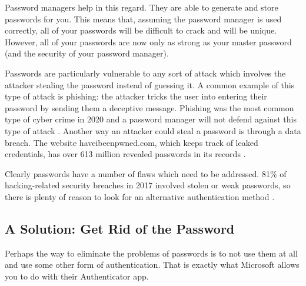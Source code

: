 \documentclass[12pt, letterpaper]{article}
\begin{document}
Password managers help in this regard.
They are able to generate and store passwords for you.
This means that, assuming the password manager is used correctly, all of your passwords will be difficult to crack and will be unique. 
However, all of your passwords are now only as strong as your master password (and the security of your password manager).

Passwords are particularly vulnerable to any sort of attack which involves the attacker stealing the password instead of guessing it.
A common example of this type of attack is phishing: the attacker tricks the user into entering their password by sending them a deceptive message.
Phishing was the most common type of cyber crime in 2020 and a password manager will not defend against this type of attack \parencite{fbi2020icr}.
Another way an attacker could steal a password is through a data breach.
The website haveibeenpwned.com, which keeps track of leaked credentials, has over 613 million revealed passwords in its records \parencite{hibpweb}.

Clearly passwords have a number of flaws which need to be addressed.
81\% of hacking-related security breaches in 2017 involved stolen or weak passwords, so there is plenty of reason to look for an alternative authentication method \parencite{verizon2017dbir}.

\subsection{A Solution: Get Rid of the Password}
Perhaps the way to eliminate the problems of passwords is to not use them at all and use some other form of authentication.
That is exactly what Microsoft allows you to do with their Authenticator app. 
\end{document}
